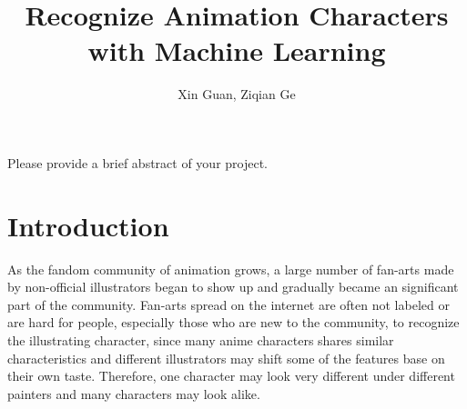 \documentclass[11.5pt]{article}
\title{Recognize Animation Characters with Machine Learning}
\author{Xin Guan, Ziqian Ge}
\date{}
\begin{document}
    \maketitle

    \abstract
    Please provide a brief abstract of your project.
    

    \vspace{2mm}


    \section{Introduction}
    As the fandom community of animation grows, a large number of fan-arts made by non-official illustrators began to show up and gradually became an significant part of the community.
    Fan-arts spread on the internet are often not labeled or are hard for people, especially those who are new to the community, to recognize the illustrating character, since many anime characters shares similar characteristics and different illustrators may shift some of the features base on their own taste. Therefore, one character may look very different under different painters and many characters may look alike.
\end{document}
